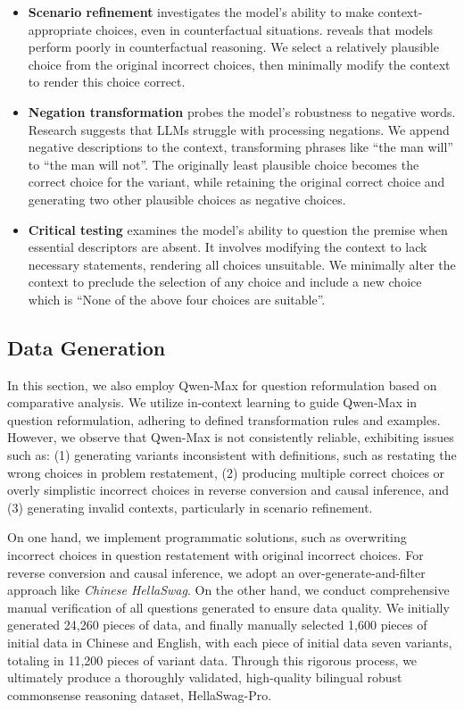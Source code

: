 \begin{itemize}[leftmargin=*]
    \item \textbf{Scenario refinement} investigates the model's ability to make context-appropriate choices, even in counterfactual situations. \citep{ma2024kor} reveals that models perform poorly in counterfactual reasoning. We select a relatively plausible choice from the original incorrect choices, then minimally modify the context to render this choice correct.

    \item \textbf{Negation transformation} probes the model's robustness to negative words. Research suggests that LLMs struggle with processing negations. We append negative descriptions to the context, transforming phrases like ``the man will'' to ``the man will not''. The originally least plausible choice becomes the correct choice for the variant, while retaining the original correct choice and generating two other plausible choices as negative choices.

    \item \textbf{Critical testing} examines the model's ability to question the premise when essential descriptors are absent. It involves modifying the context to lack necessary statements, rendering all choices unsuitable. We minimally alter the context to preclude the selection of any choice and include a new choice which is ``None of the above four choices are suitable''.
\end{itemize}

\subsection{Data Generation}

In this section, we also employ Qwen-Max for question reformulation based on comparative analysis. We utilize in-context learning to guide Qwen-Max in question reformulation, adhering to defined transformation rules and examples. However, we observe that Qwen-Max is not consistently reliable, exhibiting issues such as: (1) generating variants inconsistent with definitions, such as restating the wrong choices in problem restatement, (2) producing multiple correct choices or overly simplistic incorrect choices in reverse conversion and causal inference, and (3) generating invalid contexts, particularly in scenario refinement.

On one hand, we implement programmatic solutions, such as overwriting incorrect choices in question restatement with original incorrect choices. For reverse conversion and causal inference, we adopt an over-generate-and-filter approach like \textit{Chinese HellaSwag}. On the other hand, we conduct comprehensive manual verification of all questions generated to ensure data quality. We initially generated 24,260 pieces of data, and finally manually selected 1,600 pieces of initial data in Chinese and English, with each piece of initial data seven variants, totaling in 11,200 pieces of variant data. Through this rigorous process, we ultimately produce a thoroughly validated, high-quality bilingual robust commonsense reasoning dataset, HellaSwag-Pro.



